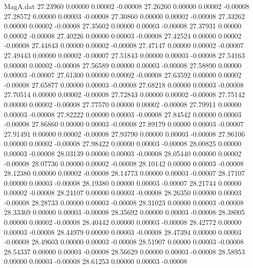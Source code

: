\begin{filecontents}{MagA.dat}
  27.23960    0.00000    0.00002   -0.00008
  27.26260    0.00000    0.00002   -0.00008
  27.28572    0.00000    0.00003   -0.00008
  27.30860    0.00000    0.00002   -0.00008
  27.33262    0.00000    0.00002   -0.00008
  27.35602    0.00000    0.00003   -0.00008
  27.37931    0.00000    0.00002   -0.00008
  27.40226    0.00000    0.00003   -0.00008
  27.42524    0.00000    0.00002   -0.00008
  27.44843    0.00000    0.00002   -0.00008
  27.47147    0.00000    0.00002   -0.00007
  27.49443    0.00000    0.00002   -0.00007
  27.51843    0.00000    0.00003   -0.00008
  27.54163    0.00000    0.00002   -0.00008
  27.56589    0.00000    0.00003   -0.00008
  27.58890    0.00000    0.00003   -0.00007
  27.61300    0.00000    0.00002   -0.00008
  27.63592    0.00000    0.00002   -0.00008
  27.65877    0.00000    0.00003   -0.00008
  27.68218    0.00000    0.00003   -0.00008
  27.70514    0.00000    0.00002   -0.00008
  27.72843    0.00000    0.00002   -0.00008
  27.75142    0.00000    0.00002   -0.00008
  27.77570    0.00000    0.00002   -0.00008
  27.79911    0.00000    0.00003   -0.00008
  27.82222    0.00000    0.00003   -0.00008
  27.84542    0.00000    0.00003   -0.00008
  27.86860    0.00000    0.00003   -0.00008
  27.89179    0.00000    0.00003   -0.00007
  27.91491    0.00000    0.00002   -0.00008
  27.93790    0.00000    0.00003   -0.00008
  27.96106    0.00000    0.00002   -0.00008
  27.98422    0.00000    0.00003   -0.00008
  28.00825    0.00000    0.00003   -0.00008
  28.03139    0.00000    0.00003   -0.00008
  28.05440    0.00000    0.00002   -0.00008
  28.07736    0.00000    0.00002   -0.00008
  28.10142    0.00000    0.00003   -0.00008
  28.12380    0.00000    0.00002   -0.00008
  28.14773    0.00000    0.00003   -0.00007
  28.17107    0.00000    0.00003   -0.00008
  28.19380    0.00000    0.00003   -0.00007
  28.21744    0.00000    0.00002   -0.00008
  28.24107    0.00000    0.00003   -0.00008
  28.26350    0.00000    0.00003   -0.00008
  28.28733    0.00000    0.00003   -0.00008
  28.31023    0.00000    0.00003   -0.00008
  28.33369    0.00000    0.00003   -0.00008
  28.35692    0.00000    0.00003   -0.00008
  28.38005    0.00000    0.00002   -0.00008
  28.40442    0.00000    0.00003   -0.00008
  28.42772    0.00000    0.00003   -0.00008
  28.44979    0.00000    0.00003   -0.00008
  28.47394    0.00000    0.00003   -0.00008
  28.49603    0.00000    0.00003   -0.00008
  28.51907    0.00000    0.00003   -0.00008
  28.54337    0.00000    0.00003   -0.00008
  28.56629    0.00000    0.00003   -0.00008
  28.58953    0.00000    0.00003   -0.00008
  28.61253    0.00000    0.00003   -0.00008

\end{filecontents}
